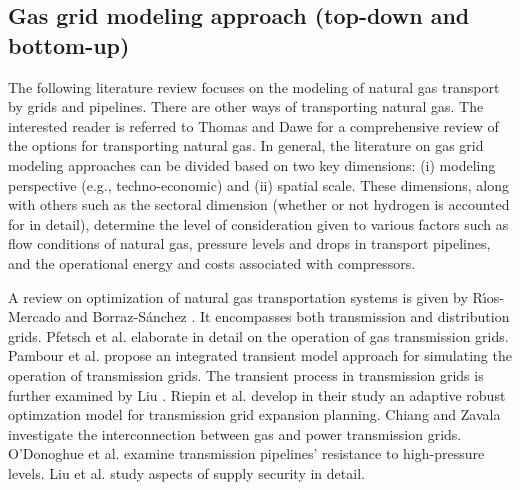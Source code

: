 \subsection{Gas grid modeling approach (top-down and bottom-up)}\label{approaches}
The following literature review focuses on the modeling of natural gas transport by grids and pipelines. There are other ways of transporting natural gas. The interested reader is referred to Thomas and Dawe \cite{thomas2003review} for a comprehensive review of the options for transporting natural gas. In general, the literature on gas grid modeling approaches can be divided based on two key dimensions: (i) modeling perspective (e.g., techno-economic) and (ii) spatial scale. These dimensions, along with others such as the sectoral dimension (whether or not hydrogen is accounted for in detail), determine the level of consideration given to various factors such as flow conditions of natural gas, pressure levels and drops in transport pipelines, and the operational energy and costs associated with compressors.\vspace{0.3cm}

A review on optimization of natural gas transportation systems is given by R{\'\i}os-Mercado and Borraz-S{\'a}nchez \cite{rios2015optimization}. It encompasses both transmission and distribution grids. Pfetsch et al. \cite{pfetsch2015validation} elaborate in detail on the operation of gas transmission grids. Pambour et al. \cite{pambour2016integrated} propose an integrated transient model approach for simulating the operation of transmission grids. The transient process in transmission grids is further examined by Liu \cite{liu2011coordinated}. Riepin et al. \cite{riepin2022adaptive} develop in their study an adaptive robust optimzation model for transmission grid expansion planning. Chiang and Zavala \cite{chiang2016large} investigate the interconnection between gas and power transmission grids. O'Donoghue et al. \cite{o1997development} examine transmission pipelines' resistance to high-pressure levels. Liu et al. \cite{liu2009security} study aspects of supply security in detail.\vspace{0.3cm}

